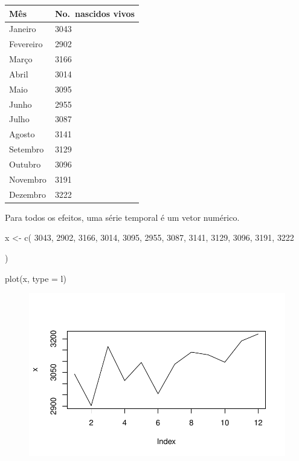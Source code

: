 \documentclass[
  letterpaper,
  DIV=11,
  numbers=noendperiod]{scrreprt}
\newenvironment{Shaded}{\begin{snugshade}}{\end{snugshade}}
\newcommand{\AttributeTok}[1]{\textcolor[rgb]{0.40,0.45,0.13}{#1}}
\newcommand{\DecValTok}[1]{\textcolor[rgb]{0.68,0.00,0.00}{#1}}
\newcommand{\FunctionTok}[1]{\textcolor[rgb]{0.28,0.35,0.67}{#1}}
\newcommand{\NormalTok}[1]{\textcolor[rgb]{0.00,0.23,0.31}{#1}}
\newcommand{\OtherTok}[1]{\textcolor[rgb]{0.00,0.23,0.31}{#1}}
\newcommand{\StringTok}[1]{\textcolor[rgb]{0.13,0.47,0.30}{#1}}
\begin{document}
\begin{longtable}[]{@{}ll@{}}
\toprule\noalign{}
Mês & No.~nascidos vivos \\
\midrule\noalign{}
\endhead
\bottomrule\noalign{}
\endlastfoot
Janeiro & 3043 \\
Fevereiro & 2902 \\
Março & 3166 \\
Abril & 3014 \\
Maio & 3095 \\
Junho & 2955 \\
Julho & 3087 \\
Agosto & 3141 \\
Setembro & 3129 \\
Outubro & 3096 \\
Novembro & 3191 \\
Dezembro & 3222 \\
\end{longtable}

Para todos os efeitos, uma série temporal é um vetor numérico.

\begin{Shaded}
\begin{Highlighting}[]
\NormalTok{x }\OtherTok{\textless{}{-}} \FunctionTok{c}\NormalTok{(}
  \DecValTok{3043}\NormalTok{, }\DecValTok{2902}\NormalTok{, }\DecValTok{3166}\NormalTok{, }\DecValTok{3014}\NormalTok{,}
\DecValTok{3095}\NormalTok{, }\DecValTok{2955}\NormalTok{, }\DecValTok{3087}\NormalTok{, }\DecValTok{3141}\NormalTok{,}
\DecValTok{3129}\NormalTok{, }\DecValTok{3096}\NormalTok{, }\DecValTok{3191}\NormalTok{, }\DecValTok{3222}

\NormalTok{)}

\FunctionTok{plot}\NormalTok{(x, }\AttributeTok{type =} \StringTok{\textquotesingle{}l\textquotesingle{}}\NormalTok{)}
\end{Highlighting}
\end{Shaded}

\begin{figure}[H]

{\centering \includegraphics{intro_files/figure-pdf/unnamed-chunk-1-1.pdf}

}

\end{figure}
\end{document}
